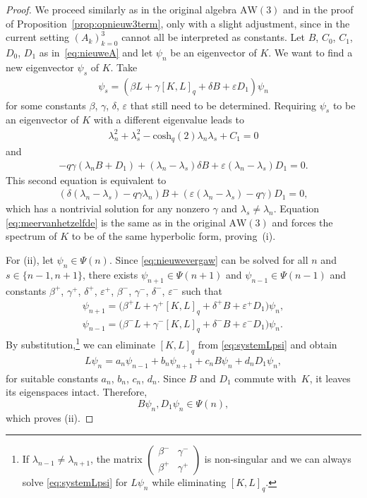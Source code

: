 \documentclass[pdftex]{sigma}
\numberwithin{equation}{section}
\newcommand{\aw}{\mathrm{AW}\!\left(3\right)}
\newcommand{\chq}{\mathrm{cosh}_q}
\newcommand{\ls}{\lambda_s}
\begin{document}
\begin{proof}
	We proceed similarly as in the original algebra $\aw$ and in the proof of Proposition~\ref{prop:opnieuw3term}, only with a slight adjustment, since in the current setting $(A_k)_{k=0}^3$ cannot all be interpreted as constants. Let $B$, $C_0$, $C_1$, $D_0$, $D_1$ as in~\eqref{eq:nieuweA} and let $\psi_n$ be an eigenvector of $K$. We want to find a new eigenvector $\psi_s$ of $K$. Take
	\begin{gather*}
		\psi_s = (\beta L + \gamma [K,L]_q + \delta B + \varepsilon D_1)\psi_n
	\end{gather*}
	for some constants $\beta$, $\gamma$, $\delta$, $\varepsilon$ that still need to be determined. Requiring $\psi_s$ to be an eigenvector of $K$ with a different eigenvalue leads to
	\begin{gather}
		\lambda_n^2+\ls^2-\chq(2)\lambda_n\ls +C_1=0\label{eq:meervanhetzelfde}
	\end{gather}
	and
	\begin{align}
		-q\gamma(\lambda_n B +D_1) + (\lambda_n-\lambda_s)\delta B +\varepsilon(\lambda_n-\lambda_s) D_1 =0.\nonumber
	\end{align}
	This second equation is equivalent to
	\begin{align}
		(\delta(\lambda_n-\lambda_s)-q\gamma\lambda_n)B + (\varepsilon(\lambda_n-\lambda_s)-q\gamma) D_1 =0, \label{eq:nieuwevergaw}
	\end{align}
	which has a nontrivial solution for any nonzero $\gamma$ and $\lambda_s\neq\lambda_n$. Equation \eqref{eq:meervanhetzelfde} is the same as in the original $\aw$ and forces the spectrum of $K$ to be of the same hyperbolic form, proving~(i).

For (ii), let $\psi_n\in\Psi(n)$. Since \eqref{eq:nieuwevergaw} can be solved for all $n$ and $s\in\{n-1,n+1\}$, there exists $\psi_{n+1}\in\Psi(n+1)$ and $\psi_{n-1}\in\Psi(n-1)$ and constants $\beta^+$, $\gamma^+$, $\delta^+$, $\varepsilon^+$, $\beta^-$, $\gamma^-$, $\delta^-$, $\varepsilon^-$ such that
	\begin{gather}
\psi_{n+1} =\big(\beta^+ L + \gamma^+ [K,L]_q + \delta^+ B + \varepsilon^+ D_1\big)\psi_n,\nonumber\\
			\psi_{n-1} =\big(\beta^-L + \gamma^- [K,L]_q + \delta^- B + \varepsilon^- D_1\big)\psi_n. \label{eq:systemLpsi}
	\end{gather}
	By substitution,\footnote{If $\lambda_{n-1}\neq\lambda_{n+1}$, the matrix $\left(\begin{smallmatrix}
			\beta^- & \gamma^- \\
			\beta^+ & \gamma^+
		\end{smallmatrix}\right)$ is non-singular and we can always solve \eqref{eq:systemLpsi} for $L\psi_n$ while eliminating $[K,L]_q$.}
	we can eliminate $[K,L]_q$ from \eqref{eq:systemLpsi} and obtain
	\begin{align*}
		L\psi_n = a_n \psi_{n-1} + b_n \psi_{n+1} + c_n B\psi_n + d_n D_1\psi_n,
	\end{align*}
	for suitable constants $a_n$, $b_n$, $c_n$, $d_n$. Since $B$ and $D_1$ commute with~$K$, it leaves its eigenspaces intact. Therefore,
	\[
	B\psi_n,D_1\psi_n \in \Psi(n),
	\]
	which proves (ii).
\end{proof}
\end{document}
